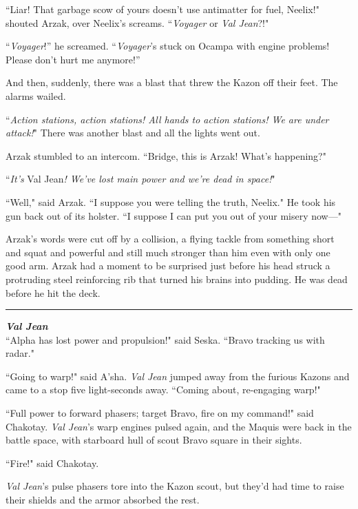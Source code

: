 \documentclass[twoside,letterpaper,12pt]{memoir}
\begin{document}
``Liar! That garbage scow of yours doesn't use antimatter for fuel, Neelix!" shouted Arzak, over Neelix's screams. ``\textit{Voyager} or \textit{Val Jean}?!"

``\textit{Voyager}!” he screamed. ``\textit{Voyager}’s stuck on Ocampa with engine problems! Please don’t hurt me anymore!”

And then, suddenly, there was a blast that threw the Kazon off their feet. The alarms wailed.

``\textit{Action stations, action stations! All hands to action stations! We are under attack!}" There was another blast and all the lights went out.

Arzak stumbled to an intercom. ``Bridge, this is Arzak! What's happening?"

``\textit{It's }Val Jean\textit{! We've lost main power and we're dead in space!}"

``Well," said Arzak. ``I suppose you were telling the truth, Neelix." He took his gun back out of its holster. ``I suppose I can put you out of your misery now---"

Arzak's words were cut off by a collision, a flying tackle from something short and squat and powerful and still much stronger than him even with only one good arm. Arzak had a moment to be surprised just before his head struck a protruding steel reinforcing rib that turned his brains into pudding. He was dead before he hit the deck.

\begin{center}\rule{3cm}{0.4 pt}\end{center}

\noindent\textit{\textbf{Val Jean}}\\

``Alpha has lost power and propulsion!" said Seska. ``Bravo tracking us with radar."

``Going to warp!" said A'sha. \textit{Val Jean} jumped away from the furious Kazons and came to a stop five light-seconds away. ``Coming about, re-engaging warp!"

``Full power to forward phasers; target Bravo, fire on my command!" said Chakotay. \textit{Val Jean}'s warp engines pulsed again, and the Maquis were back in the battle space, with starboard hull of scout Bravo square in their sights.

``Fire!" said Chakotay.

\textit{Val Jean}'s pulse phasers tore into the Kazon scout, but they’d had time to raise their shields and the armor absorbed the rest.
\end{document}
